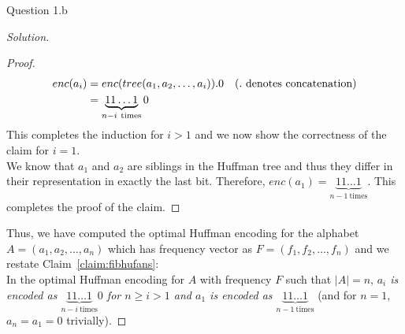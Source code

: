 \begin{solution}{Question 1.b}
\begin{proof}[Solution]
\begin{proof}
\begin{equation}
                \begin{split}
                    enc(a_i) &=enc(tree(a_1, a_2, \ldots, a_i)).0\text{\quad(.\ denotes concatenation)}\\
                    &=\underbrace{11\ldots1}_{n-i\ \text{times}}0
                \end{split}
            \end{equation}
            This completes the induction for $i>1$ and we now show the correctness of the claim for $i=1$.\\
            We know that $a_1$ and $a_2$ are siblings in the Huffman tree and thus they differ in their representation in exactly the last bit. Therefore, $enc(a_1)=\underbrace{11\ldots1}_{n-1\ \text{times}}$. This completes the proof of the claim.
        \end{proof}
        Thus, we have computed the optimal Huffman encoding for the alphabet $A=(a_1, a_2, \ldots, a_n)$ which has frequency vector as $F=(f_1, f_2, \ldots, f_n)$ and we restate Claim~\ref{claim:fibhufans}:\\
        In the optimal Huffman encoding for $A$ with frequency $F$ such that $|A|=n$, \textit{$a_i$ is encoded as $\underbrace{11\ldots1}_{n-i\ \text{times}}0$ for $n\geq i>1$ and $a_1$ is encoded as $\underbrace{11\ldots1}_{n-1\ \text{times}}$} (and for $n=1$, $a_n=a_1=0$ trivially).
    \end{proof}
\end{solution}

